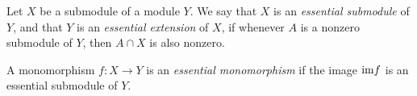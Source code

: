 \documentclass{article}
\begin{document}
Let $X$ be a submodule of a module $Y$.
We say that $X$ is an {\it essential submodule} of $Y$,
and that $Y$ is an {\it essential extension} of $X$,
if whenever $A$ is a nonzero submodule of $Y$,
then $A \cap X$ is also nonzero.

A monomorphism $f : X \to Y$ is an {\it essential monomorphism}
if the image ${\rm im} f$ is an essential submodule of $Y$.
\end{document}
